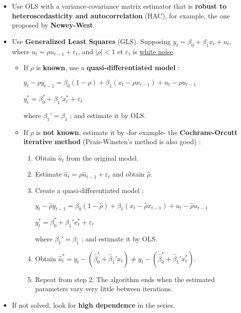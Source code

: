 \begin{f}[Correction]

\begin{itemize}[leftmargin=*]
\item Use OLS with a variance-covariance matrix estimator that is \textbf{robust to heteroscedasticity and autocorrelation} (HAC), for example, the one proposed by \textbf{Newey-West}.
\item Use \textbf{Generalized Least Squares} (GLS). Supposing $y_{t} = \beta_{0} + \beta_{1} x_{t} + u_{t}$, where $u_{t} = \rho u_{t - 1}+ \varepsilon_{t}$, and $\lvert \rho \rvert < 1$ et $\varepsilon_{t}$ is \underline{white noise}.

\begin{itemize}[leftmargin=*]
\item If $\rho$ is \textbf{known}, use a \textbf{quasi-differentiated model} :

\begin{center}
	$y_{t} - \rho y_{t - 1}= \beta_{0} (1 - \rho) + \beta_{1} (x_{t} - \rho x_{t - 1}) + u_{t} - \rho u_{t - 1}$
	
	$y_{t}^{*} = \beta_{0}^{*} + \beta_{1}' x_{t}^{*} + \varepsilon_{t}$
\end{center}

where $\beta_{1}' = \beta_{1}$ ; and estimate it by OLS.

\item If $\rho$ is \textbf{not known}, estimate it by -for example- the \textbf{Cochrane-Orcutt iterative method} (Prais-Winsten's method is also good) :

\begin{enumerate}[leftmargin=*]
	\item Obtain $\hat{u}_{t}$ from the original model.
	\item Estimate $\hat{u}_{t} = \rho \hat{u}_{t-1} + \varepsilon_{t}$ and obtain $\hat{\rho}$.
	\item Create a quasi-differentiated model :
	
	\begin{center}
		$y_{t} - \hat{\rho}y_{t - 1} = \beta_{0} (1 - \hat{\rho}) + \beta_{1} (x_{t} - \hat{\rho} x_{t - 1}) + u_{t} - \hat{\rho}u_{t - 1}$
		
		$y_{t}^{*} = \beta_{0}^{*} + \beta_{1}' x_{t}^{*} + \varepsilon_{t}$
	\end{center}
	
	where $\beta_{1}' = \beta_{1}$ ; and estimate it by OLS.
	
	\item Obtain $\hat{u}_{t}^{*} = y_{t} - (\hat{\beta}_{0}^{*} + \hat{\beta}_{1}' x_{t}) \neq y_ {t} - (\hat{\beta}_{0}^{*} + \hat{\beta}_{1}' x_{t}^{*})$.
	\item Repeat from step 2. The algorithm ends when the estimated parameters vary very little between iterations.
\end{enumerate}
\end{itemize}

\item If not solved, look for \textbf{high dependence} in the series.
\end{itemize}

\end{f}  
\columnbreak


